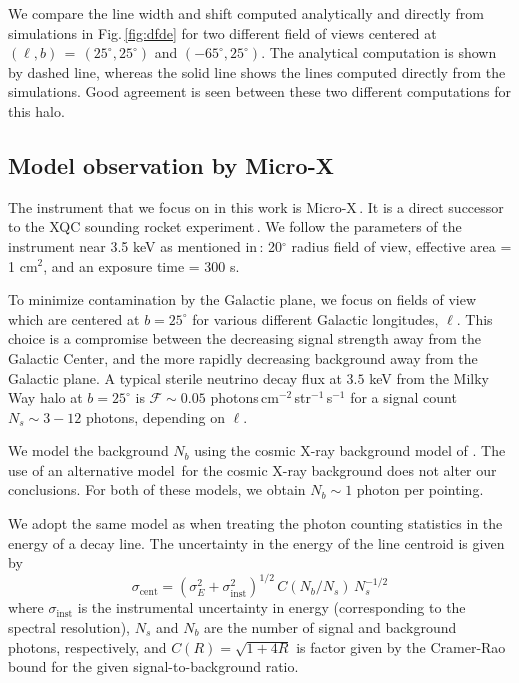 \documentclass[aps,prd,10pt,twocolumn,superscriptaddress,showpacs]{revtex4-1}
\begin{document}
We compare the line width and shift computed analytically and directly from simulations in Fig.\,\ref{fig:dfde} for two different field of views centered at $(\ell, b) \, = \, (25^\circ, 25^\circ)$ and $(-65^\circ, 25^\circ)$.  The analytical computation is shown by dashed line, whereas the solid line shows the lines computed directly from the simulations.  Good agreement is seen between these two different computations for this halo.

\subsection{Model observation by Micro-X}
\label{sec:microx}

The instrument that we focus on in this work is Micro-X\,\cite{Figueroa-Feliciano:2015gwa}.  It is a
direct successor to the XQC sounding rocket
experiment\,\cite{McCammon:2002gb,Boyarsky:2006hr,Crowder:2012ts}.  We follow the parameters of the
instrument near 3.5 keV as mentioned in\,\cite{Figueroa-Feliciano:2015gwa}: 20$^\circ$ radius field
of view, effective area = 1 cm$^2$, and an exposure time = 300 s. 

To minimize contamination by the Galactic plane, we focus on fields of view which are centered at $b = 25^\circ$ for various different Galactic longitudes, $\ell$.  This choice is a compromise between the decreasing signal strength away from the Galactic Center, and the more rapidly decreasing background away from the Galactic plane.  A typical sterile neutrino decay flux at $3.5$ keV from
the Milky Way halo at $b=25^\circ$ is $\mathcal{F}\sim 0.05$ photons\,cm$^{-2}$\,str$^{-1}$\,s$^{-1}$ 
for a signal count $N_s \sim 3-12$ photons, depending on $\ell$. 

We model the background $N_b$ using the cosmic X-ray background model of \cite{Ajello:2008xb}.  The use of an alternative model\,\cite{Hickox:2005dz} for the cosmic X-ray background does not alter our conclusions.  For both of these models, we obtain $N_b \sim 1$ photon per pointing. 

We adopt the same model as \cite{speckhard2016} when treating the photon counting statistics in the
energy of a decay line. The uncertainty in the energy of the line centroid is given by
\begin{equation} 
	\sigma_\mathrm{cent} = (\sigma_E^2 + \sigma_\mathrm{inst}^2)^{1/2} \, C(N_b/N_s) \, N_s^{-1/2}
\label{eq:stats}
\end{equation}
where $\sigma_\mathrm{inst}$ is the instrumental uncertainty in energy (corresponding to the spectral
resolution), $N_s$ and $N_b$ are the number of signal and background photons, respectively, and
$C(R)=\sqrt{1+4R}$ is factor given by the Cramer-Rao bound for the given signal-to-background ratio.
\end{document}
